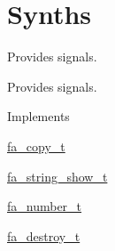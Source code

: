 \hypertarget{group___fa_signal_synths}{\section{Synths}
\label{group___fa_signal_synths}
}


Provides signals.  


Provides signals. \begin{DoxyParagraph}{Implements}

\begin{DoxyItemize}
\item \hyperlink{structfa__copy__t}{fa\-\_\-copy\-\_\-t}
\item \hyperlink{structfa__string__show__t}{fa\-\_\-string\-\_\-show\-\_\-t}
\item \hyperlink{structfa__number__t}{fa\-\_\-number\-\_\-t}
\item \hyperlink{structfa__destroy__t}{fa\-\_\-destroy\-\_\-t} 
\end{DoxyItemize}
\end{DoxyParagraph}
